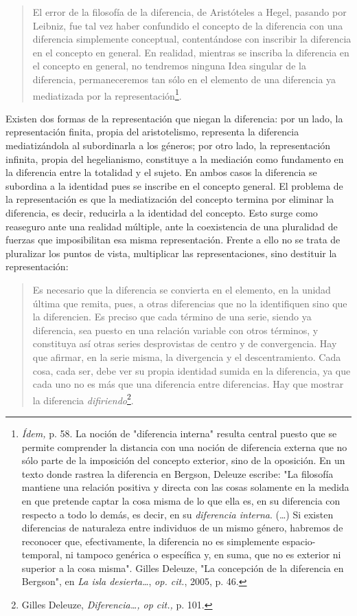 \documentclass{book}
\begin{document}
\begin{quote}
El error de la filosofía de la diferencia, de Aristóteles a Hegel,
pasando por Leibniz, fue tal vez haber confundido el concepto de la
diferencia con una diferencia simplemente conceptual, contentándose con
inscribir la diferencia en el concepto en general. En realidad, mientras
se inscriba la diferencia en el concepto en general, no tendremos
ninguna Idea singular de la diferencia, permaneceremos tan sólo en el
elemento de una diferencia ya mediatizada por la
representación\footnote{\emph{Ídem,} p. 58. La noción de "diferencia
  interna" resulta central puesto que se permite comprender la distancia
  con una noción de diferencia externa que no sólo parte de la
  imposición del concepto exterior, sino de la oposición. En un texto
  donde rastrea la diferencia en Bergson, Deleuze escribe: "La filosofía
  mantiene una relación positiva y directa con las cosas solamente en la
  medida en que pretende captar la cosa misma de lo que ella es, en su
  diferencia con respecto a todo lo demás, es decir, en su
  \emph{diferencia interna}. (\dots) Si existen diferencias de
  naturaleza entre individuos de un mismo género, habremos de reconocer
  que, efectivamente, la diferencia no es simplemente espacio-temporal,
  ni tampoco genérica o específica y, en suma, que no es exterior ni
  superior a la cosa misma". Gilles Deleuze, "La concepción de la
  diferencia en Bergson", en \emph{La isla desierta\ldots{}}, \emph{op.
  cit.}, 2005, p. 46.}.
\end{quote}

Existen dos formas de la representación que niegan la diferencia: por un
lado, la representación finita, propia del aristotelismo, representa la
diferencia mediatizándola al subordinarla a los géneros; por otro lado,
la representación infinita, propia del hegelianismo, constituye a la
mediación como fundamento en la diferencia entre la totalidad y el
sujeto. En ambos casos la diferencia se subordina a la identidad pues se
inscribe en el concepto general. El problema de la representación es que
la mediatización del concepto termina por eliminar la diferencia, es
decir, reducirla a la identidad del concepto. Esto surge como reaseguro
ante una realidad múltiple, ante la coexistencia de una pluralidad de
fuerzas que imposibilitan esa misma representación. Frente a ello no se
trata de pluralizar los puntos de vista, multiplicar las
representaciones, sino destituir la representación:

\begin{quote}
Es necesario que la diferencia se convierta en el elemento, en la unidad
última que remita, pues, a otras diferencias que no la identifiquen sino
que la diferencien. Es preciso que cada término de una serie, siendo ya
diferencia, sea puesto en una relación variable con otros términos, y
constituya así otras series desprovistas de centro y de convergencia.
Hay que afirmar, en la serie misma, la divergencia y el descentramiento.
Cada cosa, cada ser, debe ver su propia identidad sumida en la
diferencia, ya que cada uno no es más que una diferencia entre
diferencias. Hay que mostrar la diferencia \emph{difiriendo}\footnote{Gilles
  Deleuze, \emph{Diferencia\ldots, op cit.,} p. 101.}.
\end{quote}
\end{document}
